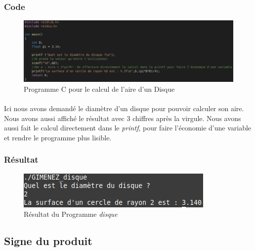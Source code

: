 \documentclass[10pt,a4paper]{article}
\begin{document}
\subsubsection{Code}
    \begin{figure}[h]
	\begin{center}
	\includegraphics[scale=.3]{images/disque_c}
	\end{center}
	\caption{Programme C pour le calcul de l'aire d'un Disque}
	\end{figure}
\paragraph{}
Ici nous avons demandé le diamètre d'un disque pour pouvoir calculer son aire. Nous avons aussi affiché le résultat avec 3 
chiffres après la virgule. Nous avons aussi fait le calcul directement dans le \emph{printf}, pour faire l'économie d'une 
variable et rendre le programme plus lisible.
\subsubsection{Résultat}
	\begin{figure}[h]
	\begin{center}
	\includegraphics[scale=.3]{images/disque_ex}
	\end{center}
	\caption{Résultat du Programme \emph{disque}}
	\end{figure}


\subsection{Signe du produit}
\end{document}
